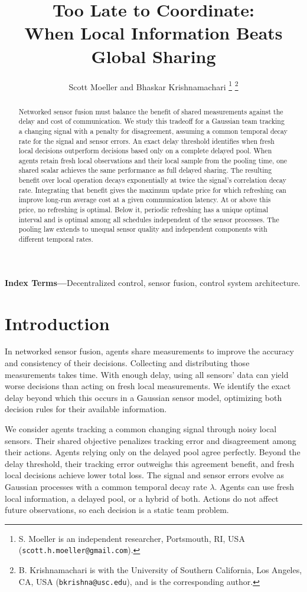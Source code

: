 \documentclass[letterpaper,10pt,conference]{ieeeconf}
\title{Too Late to Coordinate:\\When Local Information Beats Global Sharing}
\author{Scott Moeller and Bhaskar Krishnamachari%
\thanks{S. Moeller is an independent researcher, Portsmouth, RI, USA
(\texttt{scott.h.moeller@gmail.com}).}%
\thanks{B. Krishnamachari is with the University of Southern California,
Los Angeles, CA, USA (\texttt{bkrishna@usc.edu}), and is the corresponding author.}}
\begin{document}
\maketitle
\thispagestyle{empty}
\pagestyle{empty}
\begin{abstract}
Networked sensor fusion must balance the benefit of shared measurements against the delay and cost of communication. We study this tradeoff for a Gaussian team tracking a changing signal with a penalty for disagreement, assuming a common temporal decay rate for the signal and sensor errors. An exact delay threshold identifies when fresh local decisions outperform decisions based only on a complete delayed pool. When agents retain fresh local observations and their local sample from the pooling time, one shared scalar achieves the same performance as full delayed sharing. The resulting benefit over local operation decays exponentially at twice the signal's correlation decay rate. Integrating that benefit gives the maximum update price for which refreshing can improve long-run average cost at a given communication latency. At or above this price, no refreshing is optimal. Below it, periodic refreshing has a unique optimal interval and is optimal among all schedules independent of the sensor processes. The pooling law extends to unequal sensor quality and independent components with different temporal rates.
\end{abstract}
\noindent\textbf{Index Terms---}Decentralized control, sensor fusion, control system architecture.

\section{Introduction}
In networked sensor fusion, agents share measurements to improve the accuracy and consistency of their decisions. Collecting and distributing those measurements takes time. With enough delay, using all sensors' data can yield worse decisions than acting on fresh local measurements. We identify the exact delay beyond which this occurs in a Gaussian sensor model, optimizing both decision rules for their available information.

We consider agents tracking a common changing signal through noisy local sensors. Their shared objective penalizes tracking error and disagreement among their actions. Agents relying only on the delayed pool agree perfectly. Beyond the delay threshold, their tracking error outweighs this agreement benefit, and fresh local decisions achieve lower total loss. The signal and sensor errors evolve as Gaussian processes with a common temporal decay rate $\lambda$. Agents can use fresh local information, a delayed pool, or a hybrid of both. Actions do not affect future observations, so each decision is a static team problem.
\end{document}
